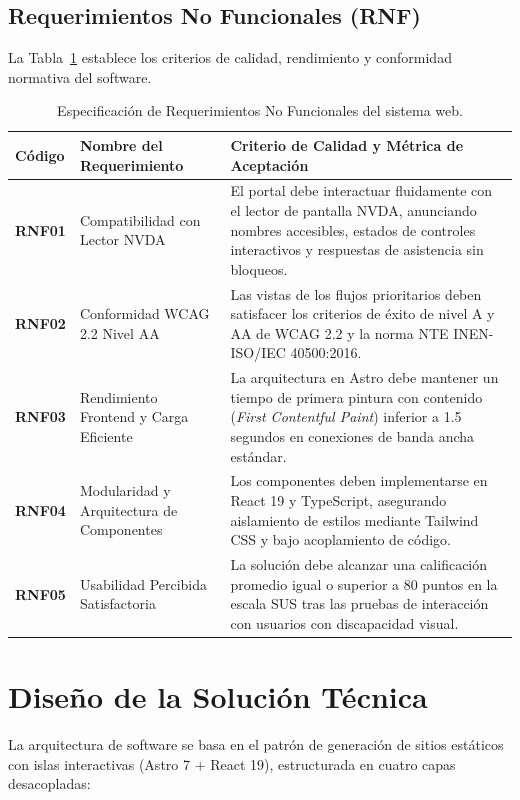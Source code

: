 \subsection{Requerimientos No Funcionales (RNF)}
La Tabla~\ref{tab:req_no_funcionales} establece los criterios de calidad, rendimiento y conformidad normativa del software.

\begin{table}[htbp]
  \centering
  \small
  \caption{Especificación de Requerimientos No Funcionales del sistema web.}
  \label{tab:req_no_funcionales}
  \setlength{\tabcolsep}{4pt}
  \renewcommand{\arraystretch}{1.25}
  \begin{tabular}{|p{}|p{}|p{}|}
    \hline
    \textbf{Código} & \textbf{Nombre del Requerimiento} & \textbf{Criterio de Calidad y Métrica de Aceptación} \\
    \hline
    \textbf{RNF01} & Compatibilidad con Lector NVDA & El portal debe interactuar fluidamente con el lector de pantalla NVDA, anunciando nombres accesibles, estados de controles interactivos y respuestas de asistencia sin bloqueos. \\
    \hline
    \textbf{RNF02} & Conformidad WCAG 2.2 Nivel AA & Las vistas de los flujos prioritarios deben satisfacer los criterios de éxito de nivel A y AA de WCAG 2.2 y la norma NTE INEN-ISO/IEC 40500:2016. \\
    \hline
    \textbf{RNF03} & Rendimiento Frontend y Carga Eficiente & La arquitectura en Astro debe mantener un tiempo de primera pintura con contenido (\textit{First Contentful Paint}) inferior a 1.5 segundos en conexiones de banda ancha estándar. \\
    \hline
    \textbf{RNF04} & Modularidad y Arquitectura de Componentes & Los componentes deben implementarse en React 19 y TypeScript, asegurando aislamiento de estilos mediante Tailwind CSS y bajo acoplamiento de código. \\
    \hline
    \textbf{RNF05} & Usabilidad Percibida Satisfactoria & La solución debe alcanzar una calificación promedio igual o superior a 80 puntos en la escala SUS tras las pruebas de interacción con usuarios con discapacidad visual. \\
    \hline
  \end{tabular}
\end{table}

\section{Diseño de la Solución Técnica}
\label{sec:diseno_solucion}
La arquitectura de software se basa en el patrón de generación de sitios estáticos con islas interactivas (Astro 7 + React 19), estructurada en cuatro capas desacopladas:

